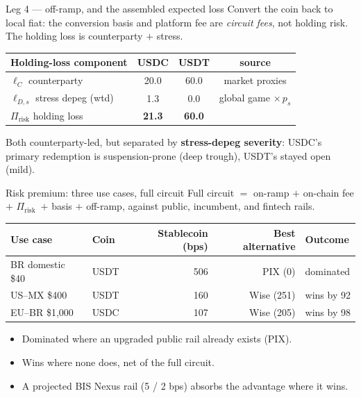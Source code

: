 \documentclass[11pt,aspectratio=169]{beamer}
\newcommand{\El}{\ensuremath{\Pi_{\text{risk}}}}
\begin{document}
\begin{frame}{Leg 4 --- off-ramp, and the assembled expected loss}
Convert the coin back to local fiat: the conversion basis and platform fee are
\emph{circuit fees}, not holding risk. The holding loss is counterparty $+$ stress.
\vspace{0.4em}
\begin{center}
\begin{tabular}{lccc}
\toprule
Holding-loss component & USDC & USDT & source \\
\midrule
\(\ell_C\) counterparty            & 20.0 & 60.0 & market proxies \\
\(\ell_{D,s}\) stress depeg (wtd)   & \phantom{0}1.3 & \phantom{0}0.0 & global game \(\times\,p_s\) \\
\midrule
\(\El\) holding loss               & \textbf{21.3} & \textbf{60.0} & \\
\bottomrule
\end{tabular}
\end{center}
\vspace{0.4em}
Both counterparty-led, but separated by \textbf{stress-depeg severity}: USDC's
primary redemption is suspension-prone (deep trough), USDT's stayed open (mild).
\end{frame}

\begin{frame}{Risk premium: three use cases, full circuit}
Full circuit \(=\) on-ramp \(+\) on-chain fee \(+\) \El\ \(+\) basis \(+\) off-ramp,
against public, incumbent, and fintech rails.
\begin{center}
\begin{tabular}{llrrl}
\toprule
Use case & Coin & Stablecoin (bps) & Best alternative & Outcome \\
\midrule
BR domestic \$40   & USDT & 506 & PIX (0)    & \textcolor{trad}{dominated} \\
US--MX \$400       & USDT & 160 & Wise (251) & \textcolor{stab}{wins by 92} \\
EU--BR \$1{,}000   & USDC & 107 & Wise (205) & \textcolor{stab}{wins by 98} \\
\bottomrule
\end{tabular}
\end{center}
\vspace{0.5em}
\begin{itemize}
  \item Dominated where an upgraded public rail already exists (PIX).
  \item Wins where none does, net of the full circuit.
  \item A projected BIS Nexus rail (5 / 2 bps) absorbs the advantage where it wins.
\end{itemize}
\end{frame}
\end{document}
